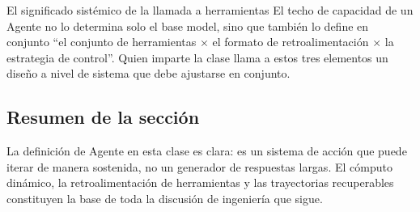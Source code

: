 \begin{importantbox}{El significado sistémico de la llamada a herramientas}
El techo de capacidad de un Agente no lo determina solo el base model, sino que también lo define en conjunto ``el conjunto de herramientas $\times$ el formato de retroalimentación $\times$ la estrategia de control''. Quien imparte la clase llama a estos tres elementos un diseño a nivel de sistema que debe ajustarse en conjunto.
\end{importantbox}

\subsection{Resumen de la sección}
La definición de Agente en esta clase es clara: es un sistema de acción que puede iterar de manera sostenida, no un generador de respuestas largas. El cómputo dinámico, la retroalimentación de herramientas y las trayectorias recuperables constituyen la base de toda la discusión de ingeniería que sigue.

